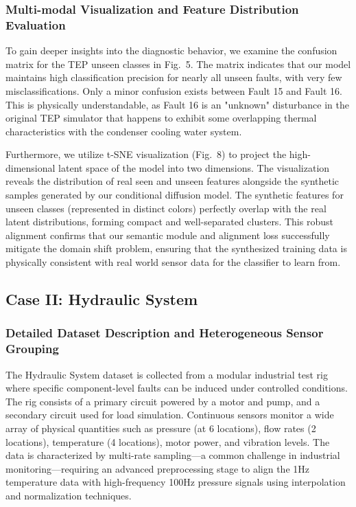 \subsubsection{Multi-modal Visualization and Feature Distribution Evaluation}
To gain deeper insights into the diagnostic behavior, we examine the confusion matrix for the TEP unseen classes in Fig.~5. The matrix indicates that our model maintains high classification precision for nearly all unseen faults, with very few misclassifications. Only a minor confusion exists between Fault 15 and Fault 16. This is physically understandable, as Fault 16 is an "unknown" disturbance in the original TEP simulator that happens to exhibit some overlapping thermal characteristics with the condenser cooling water system. 

Furthermore, we utilize t-SNE visualization (Fig.~8) to project the high-dimensional latent space of the model into two dimensions. The visualization reveals the distribution of real seen and unseen features alongside the synthetic samples generated by our conditional diffusion model. The synthetic features for unseen classes (represented in distinct colors) perfectly overlap with the real latent distributions, forming compact and well-separated clusters. This robust alignment confirms that our semantic module and alignment loss successfully mitigate the domain shift problem, ensuring that the synthesized training data is physically consistent with real world sensor data for the classifier to learn from.

\subsection{Case II: Hydraulic System}
\label{sec:case2}

\subsubsection{Detailed Dataset Description and Heterogeneous Sensor Grouping}
The Hydraulic System dataset is collected from a modular industrial test rig where specific component-level faults can be induced under controlled conditions. The rig consists of a primary circuit powered by a motor and pump, and a secondary circuit used for load simulation. Continuous sensors monitor a wide array of physical quantities such as pressure (at 6 locations), flow rates (2 locations), temperature (4 locations), motor power, and vibration levels. The data is characterized by multi-rate sampling—a common challenge in industrial monitoring—requiring an advanced preprocessing stage to align the 1Hz temperature data with high-frequency 100Hz pressure signals using interpolation and normalization techniques.

